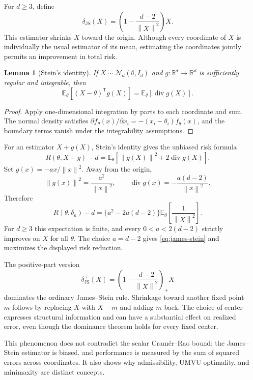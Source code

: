 \documentclass[12pt,oneside]{book}
\numberwithin{equation}{section}
\theoremstyle{definition}
\theoremstyle{plain}
\newtheorem{lemma}{Lemma}[section]
\theoremstyle{remark}
\newcommand{\R}{\mathbb{R}}
\newcommand{\E}{\mathbb{E}}
\newcommand{\norm}[1]{\left\lVert #1 \right\rVert}
\newcommand{\Normal}{\mathcal{N}}
\begin{document}
For $d\geq3$, define
\begin{equation}
    \delta_{\mathrm{JS}}(X)
    =\left(1-\frac{d-2}{\norm X^2}\right)X.
    \label{eq:james-stein}
\end{equation}
This estimator shrinks $X$ toward the origin.  Although every coordinate of
$X$ is individually the usual estimator of its mean, estimating the
coordinates jointly permits an improvement in total risk.

\begin{lemma}[Stein's identity]
If $X\sim\Normal_d(\theta,I_d)$ and $g:\R^d\to\R^d$ is sufficiently regular
and integrable, then
\[
    \E_\theta[(X-\theta)^\mathsf Tg(X)]
    =\E_\theta[\operatorname{div}g(X)].
\]
\end{lemma}

\begin{proof}
Apply one-dimensional integration by parts to each coordinate and sum.  The
normal density satisfies
$\partial f_\theta(x)/\partial x_i=-(x_i-\theta_i)f_\theta(x)$, and the
boundary terms vanish under the integrability assumptions.
\end{proof}

For an estimator $X+g(X)$, Stein's identity gives the unbiased risk formula
\begin{equation}
 R(\theta,X+g)-d
 =\E_\theta\left[\norm{g(X)}^2+2\operatorname{div}g(X)\right].
 \label{eq:stein-risk-identity}
\end{equation}
Set $g(x)=-ax/\norm x^2$.  Away from the origin,
\[
    \norm{g(x)}^2=\frac{a^2}{\norm x^2},
    \qquad
    \operatorname{div}g(x)=-\frac{a(d-2)}{\norm x^2}.
\]
Therefore
\[
 R(\theta,\delta_a)-d
 =\{a^2-2a(d-2)\}
   \E_\theta\left[\frac{1}{\norm X^2}\right].
\]
For $d\geq3$ this expectation is finite, and every
$0<a<2(d-2)$ strictly improves on $X$ for all $\theta$.  The choice $a=d-2$
gives \eqref{eq:james-stein} and maximizes the displayed risk reduction.

The positive-part version
\[
    \delta_{\mathrm{JS}}^+(X)
    =\left(1-\frac{d-2}{\norm X^2}\right)_+X
\]
dominates the ordinary James--Stein rule.  Shrinkage toward another fixed
point $m$ follows by replacing $X$ with $X-m$ and adding $m$ back.  The choice
of center expresses structural information and can have a substantial effect
on realized error, even though the dominance theorem holds for every fixed
center.

This phenomenon does not contradict the scalar Cram\'er--Rao bound: the
James--Stein estimator is biased, and performance is measured by the sum of
squared errors across coordinates.  It also shows why admissibility, UMVU
optimality, and minimaxity are distinct concepts.
\end{document}
